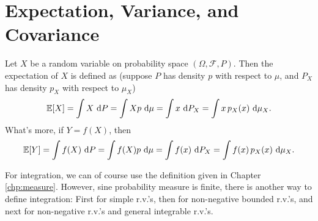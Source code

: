 \documentclass[openany]{book}
\newtheorem{theorem}{Theorem}[chapter]
\theoremstyle{definition}
\theoremstyle{remark}
\begin{document}
\section{Expectation, Variance, and Covariance}
Let $X$ be a random variable on probability space $(\Omega,\mathcal{F},P)$. Then the expectation of $X$ is defined as (suppose $P$ has density $p$ with respect to $\mu$, and $P_X$ has density $p_X$ with respect to $\mu_X$)
\begin{equation*}\label{expectation}
    \mathbb{E}[X]=\int X\,\dif P=\int Xp\,\dif\mu=\int x\,\dif P_X=\int x\,p_X(x)\,\dif\mu_X.
\end{equation*}
What's more, if $Y=f(X)$, then
\begin{equation*}
    \mathbb{E}[Y]=\int f(X)\,\dif P=\int f(X)p\,\dif\mu=\int f(x)\,\dif P_X=\int f(x)\,p_X(x)\,\dif\mu_X.
\end{equation*}

For integration, we can of course use the definition given in Chapter \ref{chp:measure}. However, sine probability measure is finite, there is another way to define integration: First for simple r.v.'s, then for non-negative bounded r.v.'s, and next for non-negative r.v.'s and general integrable r.v.'s.

\begin{comment}
In addition to the existing convergence theorem, the following theorem is also useful.
\begin{theorem}[Bounded Convergence Theorem]
    Suppose $X_n$ and $X$ always take value in $[0,M]$, and $X_n\to X$ in probability. Then
    \begin{equation*}
        \lim_{n\to\infty}\left|\mathbb{E}[X_n]-\mathbb{E}[X]\right|\le\lim_{n\to\infty}\mathbb{E}[|X_n-X|]\to0.
    \end{equation*}
\end{theorem}
\end{comment}
\end{document}
